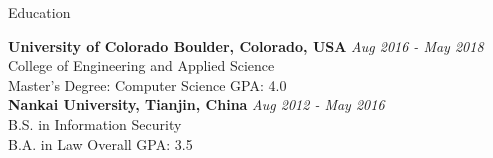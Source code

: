 \documentclass{resume} %
\begin{document}

\begin{rSection}{Education}

{\bf University of Colorado Boulder, Colorado, USA} \hfill {\em Aug 2016 - May 2018} 
\\ College of Engineering and Applied Science
\\ Master's Degree: Computer Science \hfill { GPA: 4.0 } 
\smallskip
\\{\bf Nankai University, Tianjin, China} \hfill {\em Aug 2012 - May 2016} 
\\ B.S. in Information Security
\\ B.A. in Law \hfill { Overall GPA: 3.5 }


\end{rSection}
\end{document}
